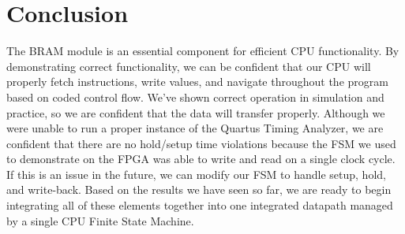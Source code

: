 \documentclass[conference]{IEEEtran}
\begin{document}
\section{Conclusion}
The BRAM module is an essential component for efficient CPU functionality. By demonstrating correct functionality, we can be confident that our CPU will properly fetch instructions, write values, and navigate throughout the program based on coded control flow. We've shown correct operation in simulation and practice, so we are confident that the data will transfer properly. Although we were unable to run a proper instance of the Quartus Timing Analyzer, we are confident that there are no hold/setup time violations because the FSM we used to demonstrate on the FPGA was able to write and read on a single clock cycle. If this is an issue in the future, we can modify our FSM to handle setup, hold, and write-back. Based on the results we have seen so far, we are ready to begin integrating all of these elements together into one integrated datapath managed by a single CPU Finite State Machine.



\end{document}

